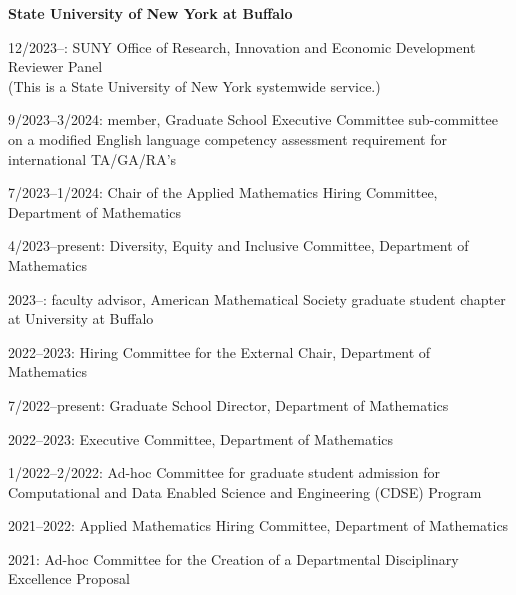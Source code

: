 \documentclass[11pt,letter]{article}
\renewenvironment{itemize}{
  \begin{list}{}{
    \setlength{\leftmargin}{1.5em}
    \setlength{\itemsep}{0.25em}
    \setlength{\parskip}{0pt}
    \setlength{\parsep}{0.25em}
  }
}{
  \end{list}
}
\begin{document}
\begin{itemize}

\item \textbf{State University of New York at Buffalo}

\item 12/2023--: SUNY Office of Research, Innovation and Economic Development Reviewer Panel\\
(This is a State University of New York systemwide service.) 
% 


\item 9/2023--3/2024: member, Graduate School Executive Committee sub-committee on a modified English language competency assessment requirement for international TA/GA/RA's

\item 7/2023--1/2024: Chair of the Applied Mathematics Hiring Committee, Department of Mathematics


\item 4/2023--present: Diversity, Equity and Inclusive Committee, Department of Mathematics

\item 2023--: faculty advisor, American Mathematical Society graduate student chapter at University at Buffalo

\item 2022--2023: Hiring Committee for the External Chair, Department of Mathematics

\item 7/2022--present: Graduate School Director, Department of Mathematics

\item 2022--2023: Executive Committee, Department of Mathematics

\item 1/2022--2/2022: Ad-hoc Committee for graduate student admission for Computational and Data Enabled Science and Engineering (CDSE) Program

\item 2021--2022: Applied Mathematics Hiring Committee, Department of Mathematics

\item 2021: Ad-hoc Committee for the Creation of a Departmental Disciplinary Excellence Proposal


\end{itemize}
\end{document}
